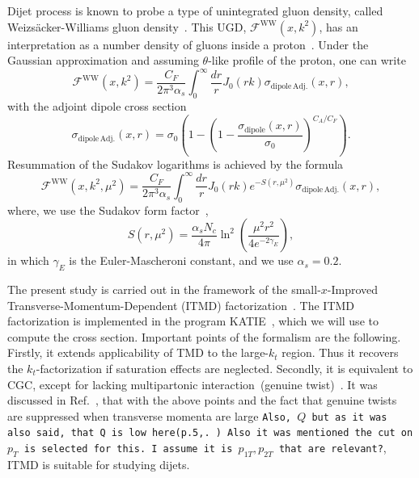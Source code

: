\documentclass[11pt]{article}
\numberwithin{equation}{section}
\numberwithin{table}{section}
\numberwithin{figure}{section}
\newcommand{\fww}[0]{\mathcal{F}^{\mathrm{WW}}}
\newcommand{\sdp}[0]{\sigma_{\mathrm{dipole}}}
\newcommand{\sdpa}[0]{\sigma_{\mathrm{dipole\,Adj.}}}
\newcommand{\comment}[1]{\texttt{\color{red}#1}}
\begin{document}
Dijet process is known to probe a type of unintegrated gluon density, called Weizs\"acker-Williams gluon density~\cite{Dominguez:2010xd,Dominguez:2011wm,Xiao:2017ggh}.
This UGD, $\fww(x,k^2)$, has an interpretation as a number density of gluons inside a proton~\cite{Dominguez:2010xd,Dominguez:2011wm}. Under the Gaussian approximation and assuming $\theta$-like profile of the proton, one can write~\cite{vanHameren:2016ftb,Xiao:2017ggh,Dominguez:2010xd,Dominguez:2011wm}
\begin{equation}
\fww(x,k^2)= \frac{C_F}{2\pi^3\alpha_s}\int^\infty_0\frac{dr}{r}J_0(r k) \sdpa(x,r),
\end{equation} 	
with the adjoint dipole cross section
\begin{equation}
\sdpa(x,r)=\sigma_0\left( 1-\left(1-\frac{\sdp(x,r)}{\sigma_0}\right)^{C_A/C_F}\right).
\label{eq:ww}
\end{equation}
Resummation of the Sudakov logarithms is achieved by the formula~\cite{Xiao:2017yya}
\begin{equation}
	\fww(x,k^2,\mu^2)= \frac{C_F}{2\pi^3\alpha_s}\int^\infty_0\frac{dr}{r}J_0(r k) e^{-S(r,\mu^2)} \sdpa(x,r),
	\label{eq:ww-sud}
\end{equation}
where, we use the Sudakov form factor~\cite{Mueller:2013wwa,Xiao:2017yya},
\begin{equation}
	S(r,\mu^2)=\frac{\alpha_s N_c}{4\pi}\ln^2\left(\frac{\mu^2r^2}{4e^{-2\gamma_E}}\right),
\end{equation}
in which $\gamma_E$ is the Euler-Mascheroni constant, and we use $\alpha_s=0.2$. 
 

  
The present study is carried out in the framework of the small-$x$-Improved Transverse-Momentum-Dependent (ITMD) factorization~\cite{Kotko:2015ura,vanHameren:2016ftb}.
The ITMD factorization is implemented in the program KATIE~\cite{vanHameren:2016kkz}, which we will use to compute the cross section. Important points of the formalism are the following. Firstly, it extends applicability of TMD to the large-$k_t$ region. Thus it recovers the $k_t$-factorization if saturation effects are neglected. Secondly, it is equivalent to CGC, except for lacking multipartonic interaction~(genuine twist)~\cite{Altinoluk:2019fui}. It was discussed in Ref.~\cite{vanHameren:2021sqc}, that with the above points and the fact that genuine twists are suppressed when transverse momenta are large \comment{Also, $Q$ but as it was also said, that Q is low here(p.5,\cite{vanHameren:2021sqc}. )  Also it was mentioned the cut on $p_T$ is selected for this. I assume it is $p_{1T}, p_{2T}$ that are relevant?}, ITMD is suitable for studying dijets.
\end{document}
